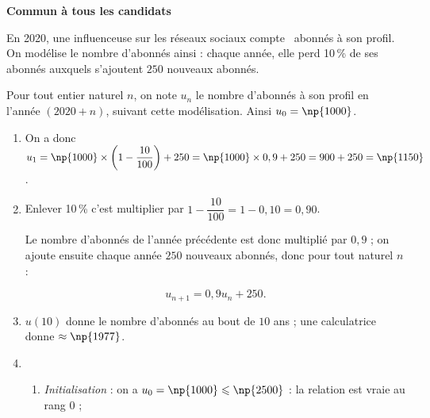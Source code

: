 
\textbf{Commun à tous les candidats}

\medskip

En 2020, une influenceuse sur les réseaux sociaux compte ~abonnés à son profil. On modélise le nombre d'abonnés ainsi : chaque année, elle perd 10\,\% de ses abonnés auxquels s'ajoutent $250$ nouveaux abonnés.

Pour tout entier naturel $n$, on note $u_n$ le nombre d'abonnés à son profil en l'année $(2020 + n)$, suivant cette modélisation. Ainsi $u_0 = \np{1000}$.

\medskip

\begin{enumerate}
\item %
On a donc $u_1 = \np{1000} \times \left(1 - \dfrac{10}{100}\right) + 250 = \np{1000} \times 0,9 + 250 = 900 + 250 = \np{1150}$.
\item %

Enlever 10\,\% c'est multiplier par $1 - \dfrac{10}{100} = 1 - 0,10 = 0,90$.

Le nombre d'abonnés de l'année précédente est donc multiplié par $0,9$ ; on ajoute ensuite chaque année $250$ nouveaux abonnés, donc pour tout naturel $n$ :

\[u_{n+1} = 0,9u_n + 250.\]

\item %

$u(10)$ donne le nombre d'abonnés au bout de $10$ ans ; une calculatrice donne $\approx \np{1977}$.
\item 
	\begin{enumerate}
		\item %
\emph{Initialisation } : on a $u_0 = \np{1000} \leqslant  \np{2500}$ : la relation est vraie au rang $0$ ;


\end{enumerate}
\end{enumerate}
